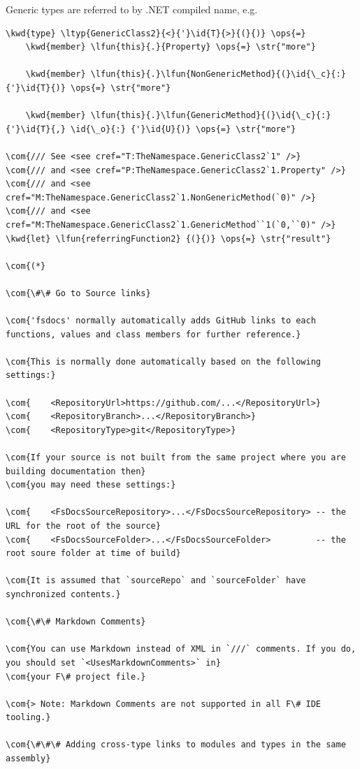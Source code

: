 \documentclass{article}
\newcommand{\id}[1]{\textcolor{black}{#1}}
\newcommand{\com}[1]{\textcolor{officegreen}{#1}}
\newcommand{\kwd}[1]{\textcolor{navy}{#1}}
\newcommand{\ops}[1]{\textcolor{purple}{#1}}
\newcommand{\str}[1]{\textcolor{olive}{#1}}
\begin{document}
Generic types are referred to by .NET compiled name, e.g.
\begin{Verbatim}[commandchars=\\\{\}]
\kwd{type} \ltyp{GenericClass2}{<}{'}\id{T}{>}{(}{)} \ops{=}
    \kwd{member} \lfun{this}{.}{Property} \ops{=} \str{"more"}

    \kwd{member} \lfun{this}{.}\lfun{NonGenericMethod}{(}\id{\_c}{:} {'}\id{T}{)} \ops{=} \str{"more"}

    \kwd{member} \lfun{this}{.}\lfun{GenericMethod}{(}\id{\_c}{:} {'}\id{T}{,} \id{\_o}{:} {'}\id{U}{)} \ops{=} \str{"more"}

\com{/// See <see cref="T:TheNamespace.GenericClass2`1" />}
\com{/// and <see cref="P:TheNamespace.GenericClass2`1.Property" />}
\com{/// and <see cref="M:TheNamespace.GenericClass2`1.NonGenericMethod(`0)" />}
\com{/// and <see cref="M:TheNamespace.GenericClass2`1.GenericMethod``1(`0,``0)" />}
\kwd{let} \lfun{referringFunction2} {(}{)} \ops{=} \str{"result"}

\com{(*}

\com{\#\# Go to Source links}

\com{'fsdocs' normally automatically adds GitHub links to each functions, values and class members for further reference.}

\com{This is normally done automatically based on the following settings:}

\com{    <RepositoryUrl>https://github.com/...</RepositoryUrl>}
\com{    <RepositoryBranch>...</RepositoryBranch>}
\com{    <RepositoryType>git</RepositoryType>}

\com{If your source is not built from the same project where you are building documentation then}
\com{you may need these settings:}

\com{    <FsDocsSourceRepository>...</FsDocsSourceRepository> -- the URL for the root of the source}
\com{    <FsDocsSourceFolder>...</FsDocsSourceFolder>         -- the root soure folder at time of build}

\com{It is assumed that `sourceRepo` and `sourceFolder` have synchronized contents.}

\com{\#\# Markdown Comments}

\com{You can use Markdown instead of XML in `///` comments. If you do, you should set `<UsesMarkdownComments>` in}
\com{your F\# project file.}

\com{> Note: Markdown Comments are not supported in all F\# IDE tooling.}

\com{\#\#\# Adding cross-type links to modules and types in the same assembly}


\end{Verbatim}
\end{document}
